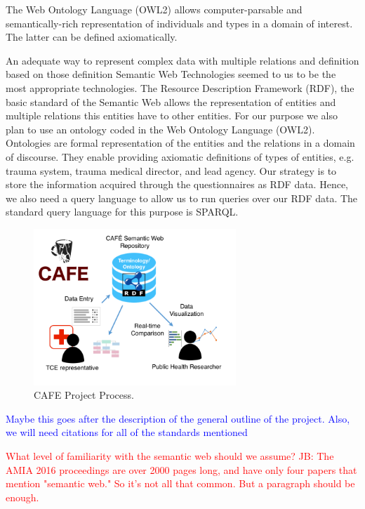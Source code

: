 \documentclass{amia}
\begin{document}
The Web Ontology Language (OWL2) allows computer-parsable and semantically-rich representation of individuals and types in a domain of interest. The latter can be defined axiomatically. 

An adequate way to represent complex data with multiple relations and definition based on those definition Semantic Web Technologies seemed to us to be the most appropriate technologies. The Resource Description Framework (RDF), the basic standard of the Semantic Web allows the representation of entities and multiple relations this entities have to other entities. For our purpose we also plan to use an ontology coded in the Web Ontology Language (OWL2). Ontologies are formal representation of the entities and the relations in a domain of discourse. They enable providing axiomatic definitions of types of entities, e.g. trauma system, trauma medical director, and lead agency. Our strategy is to store the information acquired through the questionnaires as RDF data. Hence, we also need a query language to allow us to run queries over our RDF data. The standard query language for this purpose is SPARQL.

\begin{figure}
  \begin{center}
    \includegraphics[width=0.68\textwidth]{pics/cafe_figure.png}
  \end{center}
  \caption{CAFE Project Process.}
  \label{cafe_figure}
\end{figure}

\textcolor{blue}{Maybe this goes after the description of the general outline of the project. Also, we will need citations for all of the standards mentioned}

\textcolor{red}{What level of familiarity with the semantic web should we assume?}
\textcolor{red}{JB: The AMIA 2016 proceedings are over 2000 pages long, and have only four papers that mention "semantic web." So it's not all that common. But a paragraph should be enough.}
\end{document}
